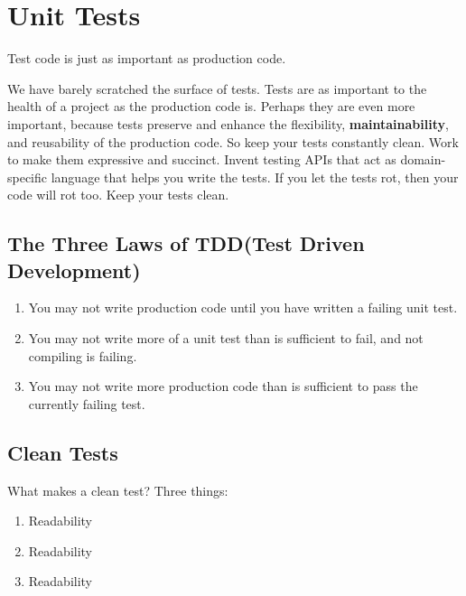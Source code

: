 
\chapter{Unit Tests}

\begin{center}
    Test code is just as important as production code.
\end{center}

We have barely scratched the surface of tests. Tests are as important to the health of a project as the production code is. Perhaps they are even more important, because tests preserve and enhance the flexibility, \textbf{maintainability}, and reusability of the production code. So keep your tests constantly clean. Work to make them expressive and succinct. Invent testing APIs that act as domain-specific language that helps you write the tests. If you let the tests rot, then your code will rot too. Keep your tests clean.

\section{The Three Laws of TDD(Test Driven Development)}

\begin{tcolorbox}[breakable, colback=blue!10!white, colframe=blue!85!black, title=The Three Laws of TDD]
\begin{enumerate}
    \item You may not write production code until you have written a failing unit test.
    \item You may not write more of a unit test than is sufficient to fail, and not compiling is failing.
    \item You may not write more production code than is sufficient to pass the currently failing test.
\end{enumerate}
\end{tcolorbox}

\section{Clean Tests}

What makes a clean test? Three things:

\begin{enumerate}
    \item Readability
    \item Readability
    \item Readability
\end{enumerate}

